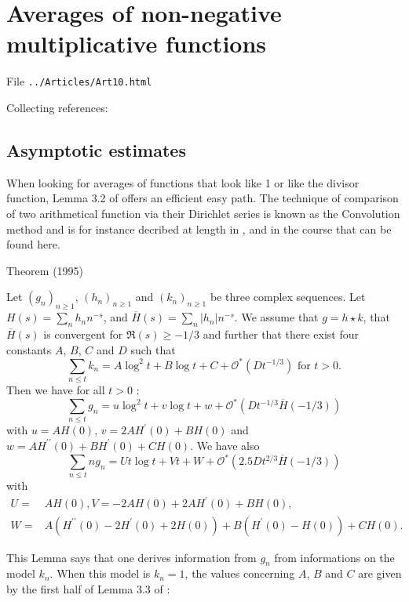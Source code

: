 \chapter{   Averages of non-negative multiplicative functions}

File \texttt{../Articles/Art10.html}










 
 


Collecting references:



\section{Asymptotic estimates
}


When looking for averages of functions that look like 1 or like the divisor
function, Lemma 3.2 of
\cite{Ramare*95} offers an
efficient easy path. The technique of comparison of two arithmetical function
via their Dirichlet series is known as the Convolution method and is for
instance decribed at length in 
\cite{Berment-Ramare*12}, and in
the course that can be found 
here.


\begin{thm}{Theorem (1995)}

Let $(g_n)_{n\ge1}$, $(h_n)_{n\ge1}$ and $(k_n)_{n\ge1}$ be three
complex sequences. Let $H(s)=\sum_nh_nn^{-s}$, and
$\overline{H}(s)=\sum_n|h_n|n^{-s}$.
We assume that $g=h\star k$, that $\overline{H}(s)$ is convergent for
$\Re(s)\ge-1/3$ and further that
there exist four constants $A$, $B$, $C$ and $D$ such that
$$
\sum_{n\le t}k_n
=
A\log^2t+B\log t+C+\mathcal{O}^*(D t^{-1/3})
\text{ for $t>0$.}
$$
Then we have for all $t>0$ :
$$
\sum_{n\le t}g_n
=
u\log^2t+v\log t+w+\mathcal{O}^*(D t^{-1/3}\overline{H}(-1/3))
$$
with
$u=AH(0)$, $v=2AH^{\prime}(0)+BH(0)$ and $w=AH^{\prime\prime}(0)+BH^{\prime}(0)+CH(0)$.
We have also
$$
\sum_{n\le t}ng_n
=
Ut\log t+Vt+W+\mathcal{O}^*(2.5D t^{2/3}\overline{H}(-1/3))
$$
with
$$
\begin{aligned}
U=&AH(0), V=-2AH(0)+2AH^{\prime}(0)+BH(0),\\
W=&A(H^{\prime\prime}(0)-2H^{\prime}(0)+2H(0))+B(H^{\prime}(0)-H(0))+CH(0).
\end{aligned}
$$
\end{thm}

This Lemma says that one derives information from $g_n$ from informations on
the model $k_n$. When this model is $k_n=1$, the values concerning $A$,
$B$ and $C$ are given by 
the first half of Lemma 3.3 of
\cite{Ramare*95}:


